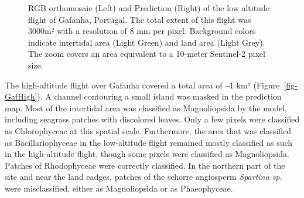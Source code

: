\documentclass[
  number]{elsarticle}
\begin{document}
\label{cell-fig-GafLow}
\begin{figure}[H]


\caption{\label{fig-GafLow}RGB orthomosaic (Left) and Prediction (Right)
of the low altitude flight of Gafanha, Portugal. The total extent of
this flight was 3000m² with a resolution of 8 mm per pixel. Background
colors indicate intertidal area (Light Green) and land area (Light
Grey). The zoom covers an area equivalent to a 10-meter Sentinel-2 pixel
size.}

\end{figure}%

The high-altitude flight over Gafanha covered a total area of
\textasciitilde1 km² (Figure~\ref{fig-GafHigh}). A channel contouring a
small island was masked in the prediction map. Most of the intertidal
area was classified as Magnoliopsida by the model, including seagrass
patches with discolored leaves. Only a few pixels were classified as
Chlorophyceae at this spatial scale. Furthermore, the area that was
classified as Bacillariophyceae in the low-altitude flight remained
mostly classified as such in the high-altitude flight, though some
pixels were classified as Magnoliopsida. Patches of Rhodophyceae were
correctly classified. In the northern part of the site and near the land
eadges, patches of the schorre angiosperm \emph{Spartina sp.} were
misclassified, either as Magnoliopsida or as Phaeophyceae.
\end{document}

